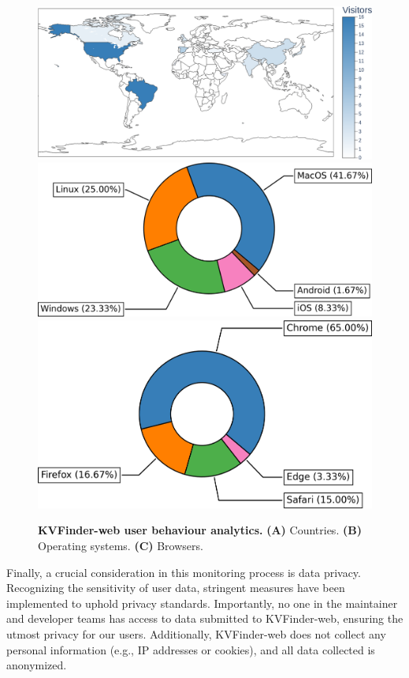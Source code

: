\documentclass[Ingles]{phdthesis}
\def\eg{e.g.\onedot}
\begin{document}
\begin{figure}[h]
  \centering
  \includegraphics[scale=0.375]{images/clarity-monitoring/clarity-countries.png}
  \includegraphics[scale=0.49]{images/clarity-monitoring/clarity-os.png}
  \includegraphics[scale=0.49]{images/clarity-monitoring/clarity-browsers.png}
  \caption[KVFinder-web user behaviour analytics]{\textbf{KVFinder-web user behaviour analytics.} \textbf{(A)} Countries. \textbf{(B)} Operating systems. \textbf{(C)} Browsers.}
  \label{fig:clarity-analytics}
\end{figure}

Finally, a crucial consideration in this monitoring process is data privacy. Recognizing the sensitivity of user data, stringent measures have been implemented to uphold privacy standards. Importantly, no one in the maintainer and developer teams has access to data submitted to KVFinder-web, ensuring the utmost privacy for our users. Additionally, KVFinder-web does not collect any personal information (\eg, IP addresses or cookies), and all data collected is anonymized.
\end{document}

